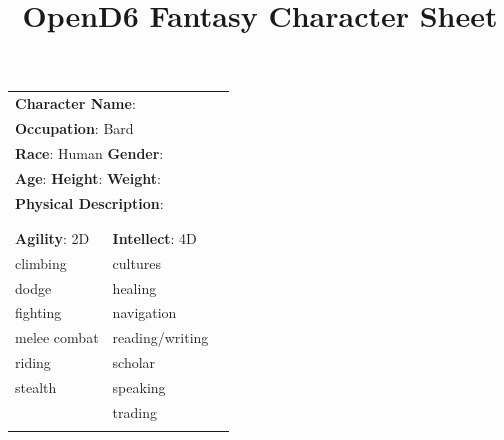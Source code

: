 \documentclass[10pt]{article}
\title{OpenD6 Fantasy Character Sheet}
\begin{document}
\pagestyle{fancy}
\fancyhf{}
\fancyfoot[R]{\thepage}
\renewcommand{\headrulewidth}{0pt}


\cleardoublepage
\begin{table}
\begin{tabular}{m{156pt} m{156pt} m{156pt}}
    \multicolumn{2}{l}{\textbf{Character Name}:  \hrulefill} \\
    \multicolumn{2}{l}{\textbf{Occupation}: Bard \hrulefill} \\
    \multicolumn{2}{l}{\textbf{Race}: Human \hrulefill \hspace{1em} \textbf{Gender}:  \hrulefill} \\
    \multicolumn{2}{l}{\textbf{Age}:  \hrulefill \hspace{1em} \textbf{Height}:  \hrulefill \hspace{1em}  \textbf{Weight}:  \hrulefill } \\
    \multicolumn{2}{l}{\textbf{Physical Description}:  \hrulefill } \\
    \multicolumn{2}{l}{ \hrulefill } \\
 & & \\
\textbf{Agility}: 2D \hrulefill      & \textbf{Intellect}: 4D \hrulefill  &                             \\

climbing             \hrulefill & cultures             \hrulefill & \\

dodge                \hrulefill & healing              \hrulefill & \\

fighting             \hrulefill & navigation           \hrulefill & \\

melee combat         \hrulefill & reading/writing      \hrulefill & \\

riding               \hrulefill & scholar              \hrulefill & \\

stealth              \hrulefill & speaking             \hrulefill & \\

 \hrulefill & trading              \hrulefill & \\

 \hrulefill &  \hrulefill & \\


\end{tabular}
\end{table}
\end{document}
